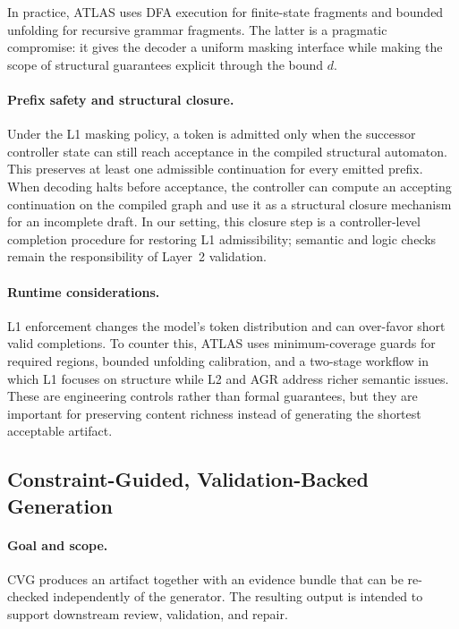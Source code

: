 \documentclass[acmlarge,nonacm]{acmart}
\theoremstyle{acmplain}
\theoremstyle{acmdefinition}
\begin{document}
In practice, ATLAS uses DFA execution for finite-state fragments and bounded unfolding for recursive grammar fragments. The latter is a pragmatic compromise: it gives the decoder a uniform masking interface while making the scope of structural guarantees explicit through the bound $d$.

\paragraph{Prefix safety and structural closure.}
Under the L1 masking policy, a token is admitted only when the successor controller state can still reach acceptance in the compiled structural automaton. This preserves at least one admissible continuation for every emitted prefix. When decoding halts before acceptance, the controller can compute an accepting continuation on the compiled graph and use it as a structural closure mechanism for an incomplete draft. In our setting, this closure step is a controller-level completion procedure for restoring L1 admissibility; semantic and logic checks remain the responsibility of Layer~2 validation.

\paragraph{Runtime considerations.}
L1 enforcement changes the model's token distribution and can over-favor short valid completions. To counter this, ATLAS uses minimum-coverage guards for required regions, bounded unfolding calibration, and a two-stage workflow in which L1 focuses on structure while L2 and AGR address richer semantic issues. These are engineering controls rather than formal guarantees, but they are important for preserving content richness instead of generating the shortest acceptable artifact.

\subsection{Constraint-Guided, Validation-Backed Generation}
\label{sec:evidence-bundle}

\paragraph{Goal and scope.}
CVG produces an artifact together with an evidence bundle that can be re-checked independently of the generator. The resulting output is intended to support downstream review, validation, and repair.
\end{document}
